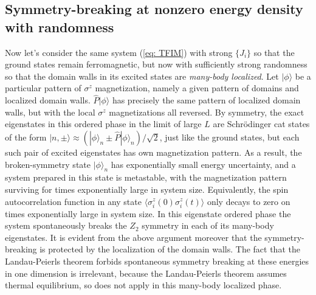 \documentclass[amsmath,onecolumn, superscriptaddress,preprint,aps]{revtex4}
\begin{document}
  \subsection{Symmetry-breaking at nonzero energy density with randomness}
  \label{sec: SSB}
  Now let's consider the same system (\ref{eq: TFIM}) with strong $\{J_i\}$ so that the ground states remain ferromagnetic,
  but now with sufficiently strong randomness so that the domain walls
  in its excited states are {\it many-body localized}.  Let $|\phi\rangle$ be a particular
  pattern of $\sigma^z$ magnetization, namely a given pattern of domains and localized domain walls.
  $\hat P |\phi \rangle$ has precisely the same pattern of localized domain walls, but with the local $\sigma^z$ magnetizations all reversed.
  By symmetry, the exact eigenstates in this ordered phase in the limit of large $L$ are Schr\"odinger cat states of the form
  $|n,\pm\rangle \approx (|\phi \rangle_n \pm \hat P |\phi \rangle_n)/\sqrt{2}$, just like the ground states, but each such pair of excited eigenstates
  has own magnetization pattern.
  As a result, the broken-symmetry state $|\phi\rangle_n$ has exponentially small energy uncertainty, and a system prepared in this state
  is metastable, with the magnetization pattern surviving for times exponentially large in system size.  Equivalently, the spin autocorrelation function in any state $\langle \sigma^z_i(0) \sigma^z_i(t)\rangle$ only decays to zero on times exponentially large in system size.
  In this eigenstate ordered phase the system spontaneously breaks the $Z_2$ symmetry in each of its many-body eigenstates.  It is evident from the above argument moreover that the symmetry-breaking is protected by the localization of the domain walls.  The fact that the Landau-Peierls theorem forbids spontaneous symmetry breaking at these energies in one dimension is irrelevant, because the Landau-Peierls theorem assumes thermal equilibrium, so does not apply in this many-body localized phase.
\end{document}
